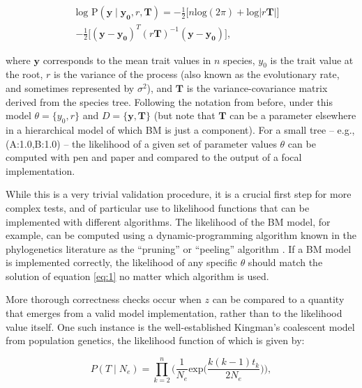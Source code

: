 \documentclass[oneside]{article}
\begin{document}
\begin{equation}
  \begin{split}
    \text{log P}(\mathbf{y} \mid \mathbf{y_0}, r, \mathbf{T}) = -\frac{1}{2} \Big[ n\text{log}(2\pi) + \text{log}|r \mathbf{T}| \Big] & \\
    -\frac{1}{2} \Big[ (\mathbf{y} - \mathbf{y_0})^T (r \mathbf{T})^{-1} (\mathbf{y} - \mathbf{y_0}) \Big],
  \label{eq:1}
  \end{split}
\end{equation}

\noindent where $\mathbf{y}$ corresponds to the mean trait values in $n$ species,
$y_0$ is the trait value at the root, $r$ is the variance of the process
(also known as the evolutionary rate, and sometimes represented by $\sigma^2$), and $\mathbf{T}$ is the
variance-covariance matrix derived from the species tree.
Following the notation from before, under this model $\theta = \{y_0,
r\}$ and $D = \{\mathbf{y, \mathbf{T}} \}$ (but note that $\mathbf{T}$ can
be a parameter elsewhere in a hierarchical model of which BM is just a
component).
For a small tree -- e.g., (A:1.0,B:1.0) -- the likelihood of a given set
of parameter values $\theta$ can be computed with pen and paper and compared to
the output of a focal implementation.

While this is a very trivial validation procedure, it is a crucial first
step for more complex tests, and of particular use to likelihood functions that can be
implemented with different algorithms.
The likelihood of the BM model, for example, can be computed using a
dynamic-programming algorithm known in the phylogenetics literature
as the ``pruning'' or ``peeling'' algorithm \citep{felsenstein73}.
If a BM model is implemented correctly, the likelihood of any specific
$\theta$ should match the solution of equation \ref{eq:1} no matter which algorithm is used.

More thorough correctness checks occur when $z$ can be
compared to a quantity that emerges from a valid model implementation,
rather than to the likelihood value itself.
One such instance is the well-established Kingman's coalescent model \citep{kingman82}
from population genetics, the likelihood function of which is given by:

\begin{equation}
  P(T \mid N_e) = \prod_{k=2}^{n} \Bigg( \frac{1}{N_e} \text{exp} \Bigg(
  \frac{k(k-1)t_k}{2N_e} \Bigg) \Bigg),
  \label{eq:2}
\end{equation}
\end{document}
